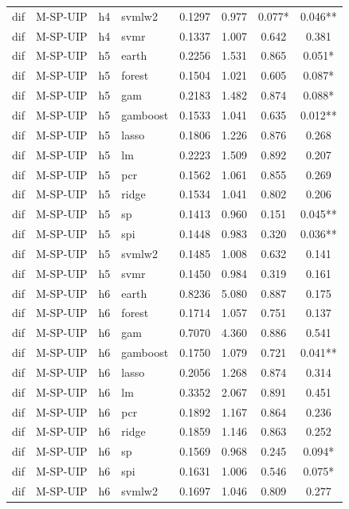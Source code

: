\begin{ThreePartTable}
\begin{longtable}[t]{llclcccc}
dif & M-SP-UIP & h4 & svmlw2 & 0.1297 & 0.977 & 0.077* & 0.046**\\
dif & M-SP-UIP & h4 & svmr & 0.1337 & 1.007 & 0.642 & 0.381\\
\addlinespace
dif & M-SP-UIP & h5 & earth & 0.2256 & 1.531 & 0.865 & 0.051*\\
dif & M-SP-UIP & h5 & forest & 0.1504 & 1.021 & 0.605 & 0.087*\\
dif & M-SP-UIP & h5 & gam & 0.2183 & 1.482 & 0.874 & 0.088*\\
dif & M-SP-UIP & h5 & gamboost & 0.1533 & 1.041 & 0.635 & 0.012**\\
dif & M-SP-UIP & h5 & lasso & 0.1806 & 1.226 & 0.876 & 0.268\\
dif & M-SP-UIP & h5 & lm & 0.2223 & 1.509 & 0.892 & 0.207\\
dif & M-SP-UIP & h5 & pcr & 0.1562 & 1.061 & 0.855 & 0.269\\
dif & M-SP-UIP & h5 & ridge & 0.1534 & 1.041 & 0.802 & 0.206\\
dif & M-SP-UIP & h5 & sp & 0.1413 & 0.960 & 0.151 & 0.045**\\
dif & M-SP-UIP & h5 & spi & 0.1448 & 0.983 & 0.320 & 0.036**\\
dif & M-SP-UIP & h5 & svmlw2 & 0.1485 & 1.008 & 0.632 & 0.141\\
dif & M-SP-UIP & h5 & svmr & 0.1450 & 0.984 & 0.319 & 0.161\\
\addlinespace
dif & M-SP-UIP & h6 & earth & 0.8236 & 5.080 & 0.887 & 0.175\\
dif & M-SP-UIP & h6 & forest & 0.1714 & 1.057 & 0.751 & 0.137\\
dif & M-SP-UIP & h6 & gam & 0.7070 & 4.360 & 0.886 & 0.541\\
dif & M-SP-UIP & h6 & gamboost & 0.1750 & 1.079 & 0.721 & 0.041**\\
dif & M-SP-UIP & h6 & lasso & 0.2056 & 1.268 & 0.874 & 0.314\\
dif & M-SP-UIP & h6 & lm & 0.3352 & 2.067 & 0.891 & 0.451\\
dif & M-SP-UIP & h6 & pcr & 0.1892 & 1.167 & 0.864 & 0.236\\
dif & M-SP-UIP & h6 & ridge & 0.1859 & 1.146 & 0.863 & 0.252\\
dif & M-SP-UIP & h6 & sp & 0.1569 & 0.968 & 0.245 & 0.094*\\
dif & M-SP-UIP & h6 & spi & 0.1631 & 1.006 & 0.546 & 0.075*\\
dif & M-SP-UIP & h6 & svmlw2 & 0.1697 & 1.046 & 0.809 & 0.277\\

\end{longtable}
\end{ThreePartTable}
